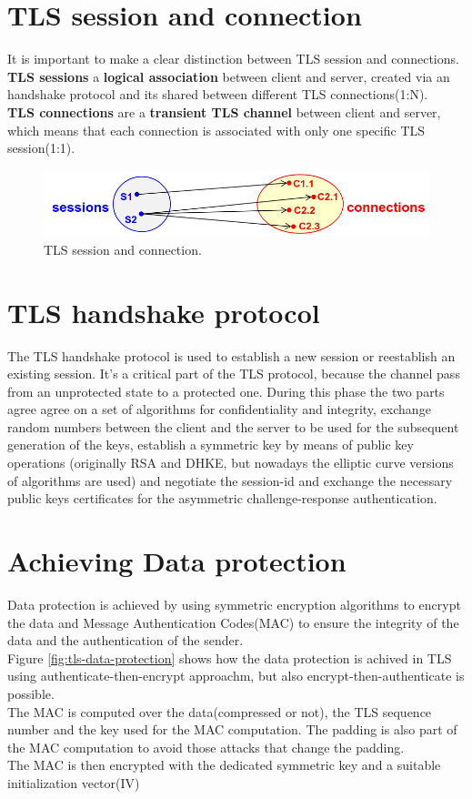 \section{TLS session and connection}
It is important to make a clear distinction between TLS session and
connections.\\
\textbf{TLS sessions} a \textbf{logical association} between client and server, created
via an handshake protocol and its shared between different TLS
connections(1:N).\\
\textbf{TLS connections} are a \textbf{transient TLS channel} between client and server,
which means that each connection is associated with only one specific
TLS session(1:1).

\begin{figure}[H]
  \centering
  \includegraphics[width=.7\textwidth]{img/TLS session connection.png}
  \caption{TLS session and connection.}
  \label{fig:tls-session-and-connection}
\end{figure}
\section{TLS handshake protocol}
The TLS handshake protocol is used to establish a new session or
reestablish an existing session. It's a critical part of the TLS
protocol, because the channel pass from an unprotected state to a
protected one. During this phase the two parts agree
agree on a set of algorithms for confidentiality and integrity,
exchange random numbers between the client and the server to be used
for the subsequent generation of the keys, establish a symmetric key
by means of public key operations (originally RSA and DHKE, but
nowadays the elliptic curve versions of algorithms are used) and negotiate the
session-id and exchange the necessary public keys certificates for the
asymmetric challenge-response authentication.

\section{Achieving Data protection}
Data protection is achieved by using symmetric encryption algorithms
to encrypt the data and Message Authentication Codes(MAC) to ensure
the integrity of the data and the authentication of the sender.\\
Figure \ref{fig:tls-data-protection} shows how the data protection is 
achived in TLS using authenticate-then-encrypt approachm, but also
encrypt-then-authenticate is possible.\\
The MAC is computed over the data(compressed or not), the TLS sequence 
number and the key used for the MAC computation. The padding is also
part of the MAC computation to avoid those attacks that change the
padding.\\
The MAC is then encrypted with the dedicated symmetric key and a
suitable initialization vector(IV) 

